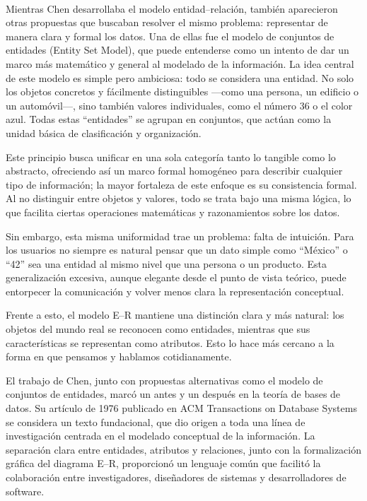 \documentclass{article}
\begin{document}
\\
Mientras Chen desarrollaba el modelo entidad–relación, también aparecieron otras propuestas que buscaban resolver el mismo problema: representar de manera clara y formal los datos. Una de ellas fue el modelo de conjuntos de entidades (Entity Set Model), que puede entenderse como un intento de dar un marco más matemático y general al modelado de la información.
La idea central de este modelo es simple pero ambiciosa: todo se considera una entidad. No solo los objetos concretos y fácilmente distinguibles —como una persona, un edificio o un automóvil—, sino también valores individuales, como el número 36 o el color azul. Todas estas “entidades” se agrupan en conjuntos, que actúan como la unidad básica de clasificación y organización.

Este principio busca unificar en una sola categoría tanto lo tangible como lo abstracto, ofreciendo así un marco formal homogéneo para describir cualquier tipo de información; la mayor fortaleza de este enfoque es su consistencia formal. Al no distinguir entre objetos y valores, todo se trata bajo una misma lógica, lo que facilita ciertas operaciones matemáticas y razonamientos sobre los datos.

Sin embargo, esta misma uniformidad trae un problema: falta de intuición. Para los usuarios no siempre es natural pensar que un dato simple como “México” o “42” sea una entidad al mismo nivel que una persona o un producto. Esta generalización excesiva, aunque elegante desde el punto de vista teórico, puede entorpecer la comunicación y volver menos clara la representación conceptual.

Frente a esto, el modelo E–R mantiene una distinción clara y más natural: los objetos del mundo real se reconocen como entidades, mientras que sus características se representan como atributos. Esto lo hace más cercano a la forma en que pensamos y hablamos cotidianamente.


El trabajo de Chen, junto con propuestas alternativas como el modelo de conjuntos de entidades, marcó un antes y un después en la teoría de bases de datos. Su artículo de 1976 publicado en ACM Transactions on Database Systems se considera un texto fundacional, que dio origen a toda una línea de investigación centrada en el modelado conceptual de la información. La separación clara entre entidades, atributos y relaciones, junto con la formalización gráfica del diagrama E–R, proporcionó un lenguaje común que facilitó la colaboración entre investigadores, diseñadores de sistemas y desarrolladores de software.
\end{document}
